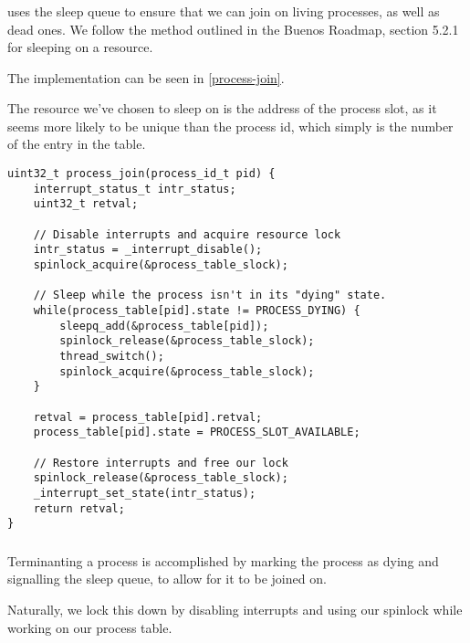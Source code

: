 \subsubsection{}
 uses the sleep queue to ensure that we can join on living
processes, as well as dead ones. We follow the method outlined in the Buenos
Roadmap, section 5.2.1 for sleeping on a resource.

The implementation can be seen in \autoref{process-join}.

The resource we've chosen to sleep on is the address of the process slot, as it
seems more likely to be unique than the process id, which simply is the number of
the entry in the table.

\begin{lstlisting}
uint32_t process_join(process_id_t pid) {
    interrupt_status_t intr_status;
    uint32_t retval;

    // Disable interrupts and acquire resource lock
    intr_status = _interrupt_disable();
    spinlock_acquire(&process_table_slock);

    // Sleep while the process isn't in its "dying" state.
    while(process_table[pid].state != PROCESS_DYING) {
        sleepq_add(&process_table[pid]);
        spinlock_release(&process_table_slock);
        thread_switch();
        spinlock_acquire(&process_table_slock);
    }

    retval = process_table[pid].retval;
    process_table[pid].state = PROCESS_SLOT_AVAILABLE;

    // Restore interrupts and free our lock
    spinlock_release(&process_table_slock);
    _interrupt_set_state(intr_status);
    return retval;
}
\end{lstlisting}

\subsubsection{}
Terminanting a process is accomplished by marking the process as dying and
signalling the sleep queue, to allow for it to be joined on.

Naturally, we lock this down by disabling interrupts and using our spinlock
while working on our process table.

\FloatBarrier %
